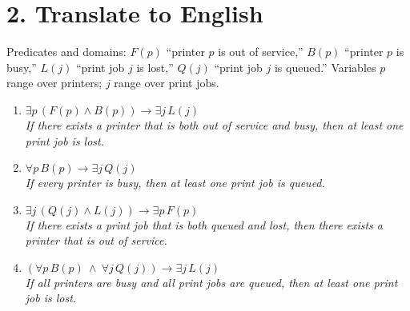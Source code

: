 \section*{2. Translate to English}
Predicates and domains: $F(p)$ “printer $p$ is out of service,” $B(p)$ “printer $p$ is busy,”
$L(j)$ “print job $j$ is lost,” $Q(j)$ “print job $j$ is queued.” Variables $p$ range over printers; $j$ range over print jobs.

\begin{enumerate}[label=(\alph*),leftmargin=*]
\item $\exists p\,(F(p)\land B(p)) \to \exists j\,L(j)$ \\
\emph{If there exists a printer that is both out of service and busy, then at least one print job is lost.}

\item $\forall p\,B(p) \to \exists j\,Q(j)$ \\
\emph{If every printer is busy, then at least one print job is queued.}

\item $\exists j\,(Q(j)\land L(j)) \to \exists p\,F(p)$ \\
\emph{If there exists a print job that is both queued and lost, then there exists a printer that is out of service.}

\item $(\forall p\,B(p)\ \land\ \forall j\,Q(j)) \to \exists j\,L(j)$ \\
\emph{If all printers are busy and all print jobs are queued, then at least one print job is lost.}
\end{enumerate}
